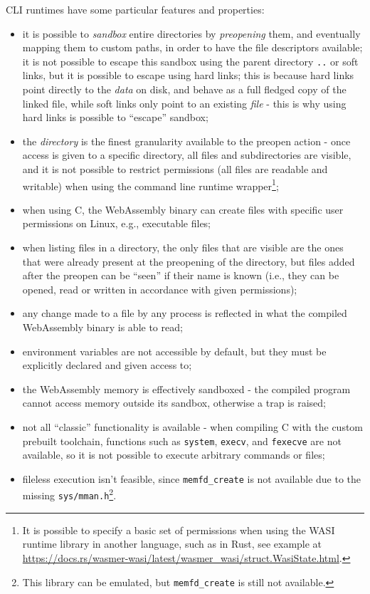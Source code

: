 CLI runtimes have some particular features and properties:
\begin{itemize}
  \item it is possible to \textit{sandbox} entire directories by \textit{preopening} them, and eventually mapping them to custom paths,
        in order to have the file descriptors available; it is not possible to escape this sandbox using the parent directory \texttt{..}
        or soft links, but it is possible to escape using hard links;
        this is because hard links point directly to the \textit{data} on disk, and behave as a full fledged copy of the linked file, while soft links
        only point to an existing \textit{file} - this is why using hard links is possible to ``escape'' sandbox;
  \item the \textit{directory} is the finest granularity available to the preopen action - once access is given to a specific directory, all files and subdirectories are
        visible, and it is not possible to restrict permissions (all files are readable and
        writable) when using the command line runtime wrapper\footnote{It is possible to specify a basic set of permissions when using the WASI runtime library in another language, such as in Rust,
        see example at \url{https://docs.rs/wasmer-wasi/latest/wasmer_wasi/struct.WasiState.html}.};
  \item when using C, the WebAssembly binary can create files with specific user permissions on Linux, e.g., executable files;
  \item when listing files in a directory, the only files that are visible are the ones that were already present at the preopening of the directory,
        but files added after the preopen can be ``seen'' if their name is known (i.e., they can be opened, read or written in accordance with given permissions);
  \item any change made to a file by any process is reflected in what the compiled WebAssembly binary is able to read;
  \item environment variables are not accessible by default, but they must be explicitly declared and given access to;
  \item the WebAssembly memory is effectively sandboxed - the compiled program cannot access memory outside its sandbox, otherwise a trap is raised;
  \item not all ``classic'' functionality is available - when compiling C with the custom prebuilt toolchain,
        functions such as \texttt{system}, \texttt{execv}, and \texttt{fexecve} are not available,
        so it is not possible to execute arbitrary commands or files;
  \item fileless execution isn't feasible, since \texttt{memfd\_create} is not available due to the missing
        \texttt{sys/mman.h}\footnote{This library can be emulated, but \texttt{memfd\_create} is still not available.}.
\end{itemize}

